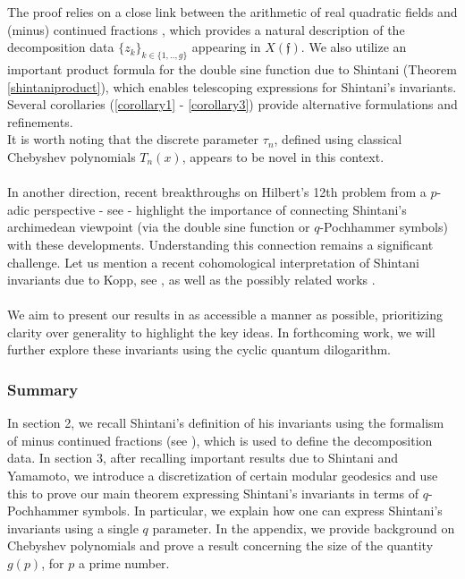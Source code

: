 \documentclass[11pt, a4paper]{amsart}
\theoremstyle{plain}
\numberwithin{equation}{section}
\begin{document}
\noindent The proof relies on a close link between the arithmetic of real quadratic fields and (minus) continued fractions \cite{zagier2013zetafunktionen,yamamoto2008kronecker}, which provides a natural description of the decomposition data $\{z_k\}_{k\in \{1,..,g\}}$ appearing in $X(\mathfrak f)$. We also utilize an important product formula for the double sine function due to Shintani (Theorem \ref{shintaniproduct}), which enables telescoping expressions for Shintani's invariants. \\
Several corollaries (\ref{corollary1} - \ref{corollary3}) provide alternative formulations and refinements. \\
It is worth noting that the discrete parameter $\tau_n$, defined using classical Chebyshev polynomials $T_n(x)$, appears to be novel in this context. \\ \\
In another direction, recent breakthroughs on Hilbert's 12th problem from a $p$-adic perspective - see \cite{dasgupta2021brumer,darmon2021singular} - highlight the importance of connecting Shintani's archimedean viewpoint (via the double sine function or $q$-Pochhammer symbols) with these developments. Understanding this connection remains a significant challenge. Let us mention a recent cohomological interpretation of Shintani invariants due to Kopp, see \cite{kopp}, as well as the possibly related works \cite{bergeron2023elliptic,gendronI}.
\\ \\
We aim to present our results in as accessible a manner as possible, prioritizing clarity over generality to highlight the key ideas. In forthcoming work, we will further explore these invariants using the cyclic quantum dilogarithm.

\subsubsection*{Summary}
In section 2, we recall Shintani's definition of his invariants using the formalism of minus continued fractions (see \cite{zagier2013zetafunktionen,yamamoto2008kronecker}), which is used to define the decomposition data. In section 3, after recalling important results due to Shintani and Yamamoto, we introduce a discretization of certain modular geodesics and use this to prove our main theorem expressing Shintani's invariants in terms of $q$-Pochhammer symbols. In particular, we explain how one can express Shintani's invariants using a single $q$ parameter. In the appendix, we provide background on Chebyshev polynomials and prove a result concerning the size of the quantity $g(p)$, for $p$ a prime number.
\end{document}
